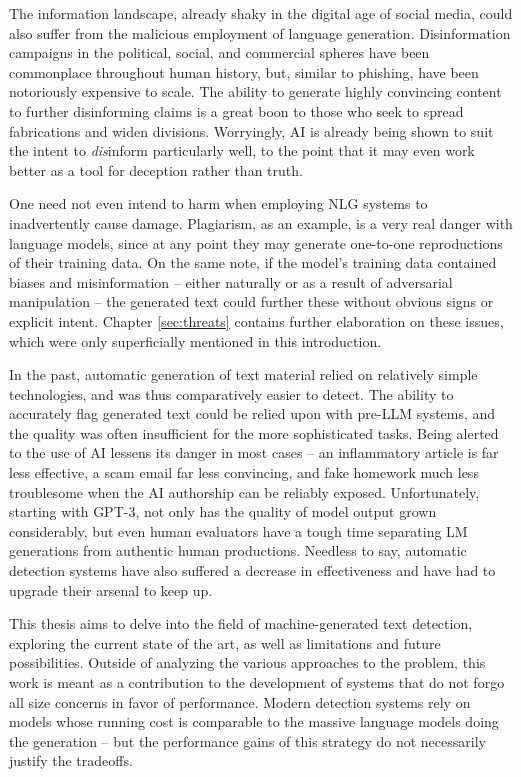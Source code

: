 The information landscape, already shaky in the digital age of social media, could also suffer from the malicious employment of language generation.
Disinformation campaigns in the political, social, and commercial spheres have been commonplace throughout human history, but, similar to phishing, have been notoriously expensive to scale.
The ability to generate highly convincing content to further disinforming claims is a great boon to those who seek to spread fabrications and widen divisions.
Worryingly, AI is already being shown to suit the intent to \emph{dis}inform particularly well, to the point that it may even work better as a tool for deception rather than truth.

One need not even intend to harm when employing NLG systems to inadvertently cause damage.
Plagiarism, as an example, is a very real danger with language models, since at any point they may generate one-to-one reproductions of their training data.
On the same note, if the model's training data contained biases and misinformation -- either naturally or as a result of adversarial manipulation -- the generated text could further these without obvious signs or explicit intent.
Chapter \ref{sec:threats} contains further elaboration on these issues, which were only superficially mentioned in this introduction.

In the past, automatic generation of text material relied on relatively simple technologies, and was thus comparatively easier to detect.
The ability to accurately flag generated text could be relied upon with pre-LLM systems, and the quality was often insufficient for the more sophisticated tasks.
Being alerted to the use of AI lessens its danger in most cases -- an inflammatory article is far less effective, a scam email far less convincing, and fake homework much less troublesome when the AI authorship can be reliably exposed.
Unfortunately, starting with GPT-3, not only has the quality of model output grown considerably, but even human evaluators have a tough time separating LM generations from authentic human productions.
Needless to say, automatic detection systems have also suffered a decrease in effectiveness and have had to upgrade their arsenal to keep up.

This thesis aims to delve into the field of machine-generated text detection, exploring the current state of the art, as well as limitations and future possibilities.
Outside of analyzing the various approaches to the problem, this work is meant as a contribution to the development of systems that do not forgo all size concerns in favor of performance.
Modern detection systems rely on models whose running cost is comparable to the massive language models doing the generation -- but the performance gains of this strategy do not necessarily justify the tradeoffs.

